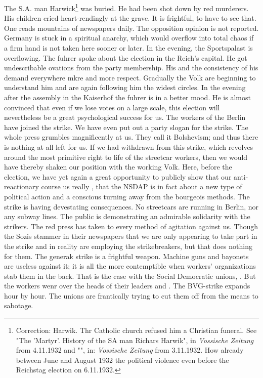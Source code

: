 
The S.A. man Harwick\footnote{Correction: Harwik. Thr Catholic church refused him a Christian funeral. See "The 'Martyr'. History of the SA man Richars Harwik", in \textit{Vossische Zeitung} from 4.11.1932 and "", in: \textit{Vossische Zeitung} from 3.11.1932. How already between June and August 1932 the political violence  even before the Reichstag election on 6.11.1932.} was buried. He had been shot down by red murderers. His children cried heart-rendingly at the grave. It is frightful, to have to see that. One reads mountains of newspapers daily. The opposition opinion is not reported. Germany is stuck in a spiritual anarchy, which would overflow into total chaos if a firm hand is not taken here sooner or later. In the evening, the Sportspalast is overflowing. The fuhrer spoke about the election in the Reich's capital. He got undescribable ovations from the party membership. His  and the consistency of his  demand everywhere mkre and more respect. Gradually the Volk are beginning to understand him and are again following him the widest circles. In the evening after the assembly in the Kaiserhof the fuhrer is in a better mood. He is almost convinced that even if we lose votes on a large scale, this election will nevertheless be a great psychological success for us. The workers of the Berlin  have joined the strike. We have even put out a party slogan for the strike. The whole press grumbles magnificently at us. They call it Bolshevism; and thus there is nothing at all left for us. If we had withdrawn from this strike, which revolves around the most primitive right to life of the streetcar workers, then we would have thereby shaken our position with the working Volk. Here, before the election, we have yet again a great opportunity to publicly show that our anti-reactionary course us really , that the NSDAP is in fact about a new type of political action and a conscious turning away from the bourgeois methods. The strike is having devestating consequences. No streetcars are running in Berlin, nor any subway lines. The public is demonstrating an admirable solidarity with the strikers. The red press has taken to every method of agitation against us. Though the Sozis stammer in their newspapers that we are only appearing to take part in the strike and in reality are employing the strikebreakers, but that does nothing for them. The generak strike is a frightful weapon. Machine guns and bayonets are useless against it; it is all the more contemptible when workers' organizations stab them in the back. That is the case with the Social Democratic unions, . But the workers wenr over the heads of their leaders and . The BVG-strike expands hour by hour. The unions are frantically trying to cut them off from the means to sabotage. 